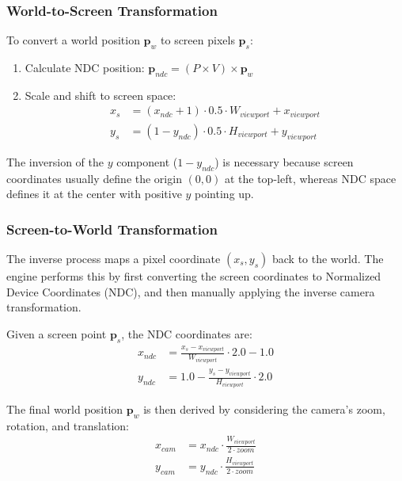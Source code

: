 \subsubsection{World-to-Screen Transformation}

To convert a world position $\mathbf{p}_w$ to screen pixels $\mathbf{p}_s$:

\begin{enumerate}
    \item Calculate NDC position: $\mathbf{p}_{ndc} = (P \times V) \times \mathbf{p}_w$
    \item Scale and shift to screen space:
    \begin{align}
    x_s &= (x_{ndc} + 1) \cdot 0.5 \cdot W_{viewport} + x_{viewport} \\
    y_s &= (1 - y_{ndc}) \cdot 0.5 \cdot H_{viewport} + y_{viewport}
    \end{align}
\end{enumerate}

The inversion of the $y$ component ($1 - y_{ndc}$) is necessary because screen coordinates usually define the origin $(0,0)$ at the top-left, whereas NDC space defines it at the center with positive $y$ pointing up.

\subsubsection{Screen-to-World Transformation}

The inverse process maps a pixel coordinate $(x_s, y_s)$ back to the world. The engine performs this by first converting the screen coordinates to Normalized Device Coordinates (NDC), and then manually applying the inverse camera transformation.

Given a screen point $\mathbf{p}_s$, the NDC coordinates are:
\begin{align}
x_{ndc} &= \frac{x_s - x_{viewport}}{W_{viewport}} \cdot 2.0 - 1.0 \\
y_{ndc} &= 1.0 - \frac{y_s - y_{viewport}}{H_{viewport}} \cdot 2.0
\end{align}

The final world position $\mathbf{p}_w$ is then derived by considering the camera's zoom, rotation, and translation:
\begin{align}
x_{cam} &= x_{ndc} \cdot \frac{W_{viewport}}{2 \cdot zoom} \\
y_{cam} &= y_{ndc} \cdot \frac{H_{viewport}}{2 \cdot zoom}
\end{align}

